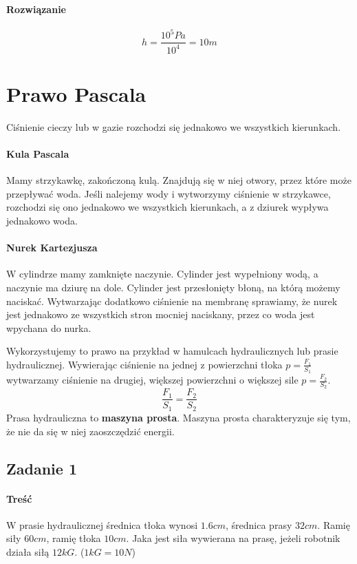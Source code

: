 \documentclass [a4paper, 11pt, oneside]{book}
\begin{document}
		\paragraph{Rozwiązanie} \[
			h = \frac{10^5Pa}{10^4} = 10m
		\]
	\section{Prawo Pascala} %
	\label{sec:prawo_pascala}
		\bf \begin{center}
			Ciśnienie cieczy lub w gazie rozchodzi się jednakowo we wszystkich kierunkach.
		\end{center} \rm
		\paragraph{Kula Pascala} Mamy strzykawkę, zakończoną kulą. Znajdują się w niej otwory, przez które może przepływać woda. Jeśli nalejemy wody i wytworzymy ciśnienie w strzykawce, rozchodzi się ono jednakowo we wszystkich kierunkach, a z dziurek wypływa jednakowo woda.
		\paragraph{Nurek Kartezjusza} W cylindrze mamy zamknięte naczynie. Cylinder jest wypełniony wodą, a naczynie ma dziurę na dole. Cylinder jest przesłonięty błoną, na którą możemy naciskać. Wytwarzając dodatkowo ciśnienie na membranę sprawiamy, że nurek jest jednakowo ze wszystkich stron mocniej naciskany, przez co woda jest wpychana do nurka.

		Wykorzystujemy to prawo na przykład w hamulcach hydraulicznych lub prasie hydraulicznej. Wywierając ciśnienie na jednej z powierzchni tłoka $p = \frac{F_1}{S_1}$ wytwarzamy ciśnienie na drugiej, większej powierzchni o większej sile $p = \frac{F_2}{S_2}$.
		\[
			\frac{F_1}{S_1} = \frac{F_2}{S_2}
		\]
		Prasa hydrauliczna to \textbf{maszyna prosta}. Maszyna prosta charakteryzuje się tym, że nie da się w niej zaoszczędzić energii.
		\subsection{Zadanie 1} %
		\label{sub:zadanie}
			\paragraph{Treść}
			W prasie hydraulicznej średnica tłoka wynosi $1.6cm$, średnica prasy $32cm$. Ramię siły $60cm$, ramię tłoka $10
			cm$. Jaka jest siła wywierana na prasę, jeżeli robotnik działa siłą $12kG$. ($1kG = 10N$)
\end{document}
